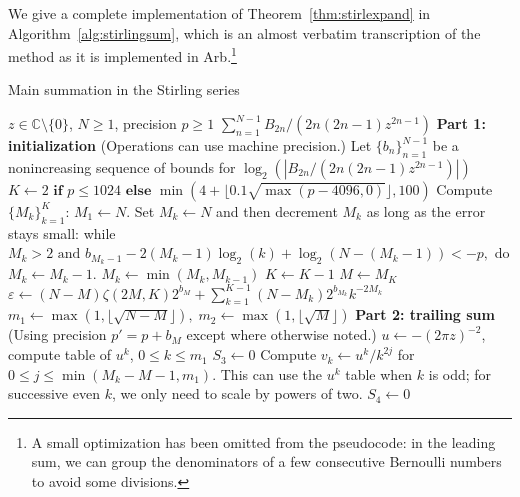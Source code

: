 \documentclass[reqno]{amsart}
\newcommand{\CC}{\mathbb{C}}
\theoremstyle{definition}
\begin{document}

We give a complete implementation
of Theorem~\ref{thm:stirlexpand} in Algorithm~\ref{alg:stirlingsum},
which is an almost verbatim transcription of the method
as it is implemented in Arb.\footnote{A small optimization has been omitted from the pseudocode: in the leading sum, we can group the denominators of a few consecutive Bernoulli numbers to avoid some divisions.}

\begin{algorithm}%
\caption{Main summation in the Stirling series}\label{alg:stirlingsum}
\small
\begin{algorithmic}[1]
\Require $z \in \CC \setminus \{ 0 \}$, $N \ge 1$, precision $p \ge 1$
\Ensure $\sum_{n=1}^{N-1} B_{2n} / (2n(2n-1) z^{2n-1})$ 
\State \textbf{Part 1: initialization} (Operations can use machine precision.)
\State Let $\{ b_n \}_{n=1}^{N-1}$ be a nonincreasing sequence of bounds for $\log_2(|B_{2n} / (2n(2n-1) z^{2n-1})|)$
\State $K \gets 2 \textbf{ if } p \le 1024 \textbf{ else } \min(4 + \lfloor 0.1 \sqrt{\max(p-4096, 0)} \rfloor, 100)$ 
\State Compute $\{ M_k \}_{k=1}^K$:
\State $M_1 \gets N$.
\State Set $M_k \gets N$ and then decrement $M_k$ as long as the error stays small:
while $M_k > 2 \text{ and } b_{M_k - 1} - 2 (M_k - 1) \log_2(k) + \log_2(N - (M_k - 1)) < -p,$ do $M_k \gets M_k - 1$.
\EndFor
{}
\State $M_k \gets \min(M_k, M_{k-1})$ 
\EndFor
{}
\State $K \gets K - 1$  
\EndWhile
\State $M \gets M_K$
\State $\varepsilon \gets (N-M) \zeta(2M, K) 2^{b_M} + \sum_{k=1}^{K-1} (N-M_k) 2^{b_{M_k}} k^{-2 M_k}$ 
\State $m_1 \gets \max(1, \lfloor \sqrt{N-M} \rfloor), \; m_2 \gets \max(1, \lfloor\sqrt{M} \rfloor)$  
\State \textbf{Part 2: trailing sum} (Using precision $p' = p + b_M$ except where otherwise noted.)
\State $u \gets - (2 \pi z)^{-2}$, compute table of $u^k$, $0 \le k \le m_1$
\State $S_3 \gets 0$
        \State Compute $v_k \gets u^k / k^{2j}$ for $0 \le j \le \min(M_k - M - 1, m_1)$. This can use the $u^k$ table when $k$ is odd; for successive even $k$, we only need to scale by powers of two.
        \State $S_4 \gets 0$

\end{algorithmic}
\end{algorithm}
\end{document}
